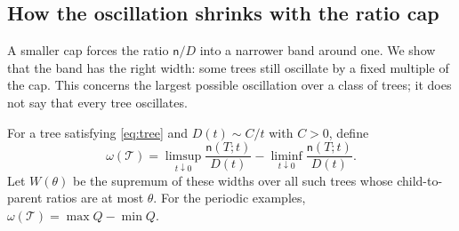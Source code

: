 \documentclass[11pt]{article}
\theoremstyle{definition}
\theoremstyle{remark}
\newcommand{\cyl}{\mathcal T}
\newcommand{\ncount}{\mathsf n}
\begin{document}
\subsection{How the oscillation shrinks with the ratio cap}
A smaller cap forces the ratio $\ncount/D$ into a narrower band around
one. We show that the band has the right width: some trees still
oscillate by a fixed multiple of the cap. This concerns the largest
possible oscillation over a class of trees; it does not say that every
tree oscillates.

For a tree satisfying \eqref{eq:tree} and $D(t)\sim C/t$ with $C>0$, define
\[
 \omega(\cyl)=\limsup_{t\downarrow0}\frac{\ncount(T;t)}{D(t)}
              -\liminf_{t\downarrow0}\frac{\ncount(T;t)}{D(t)}.
\]
Let $W(\theta)$ be the supremum of these widths over all such trees
whose child-to-parent ratios are at most $\theta$. For the periodic
examples, $\omega(\cyl)=\max Q-\min Q$.
\end{document}

